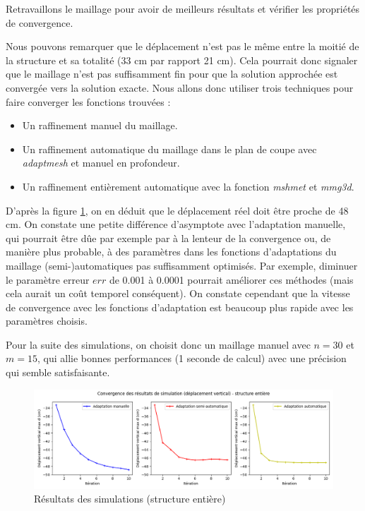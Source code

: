 \begin{problem}{4}
    Retravaillons le maillage pour avoir de meilleurs résultats et vérifier les propriétés de convergence.
\end{problem}

\begin{solution}

    Nous pouvons remarquer que le déplacement n'est pas le même entre la moitié de la structure et sa totalité (33 cm par rapport 21 cm).
    Cela pourrait donc signaler que le maillage n'est pas suffisamment fin pour que la solution approchée est convergée vers la solution exacte.
    Nous allons donc utiliser trois techniques pour faire converger les fonctions trouvées :
    \begin{itemize}
        \item Un raffinement manuel du maillage.
        \item Un raffinement automatique du maillage dans le plan de coupe avec \emph{adaptmesh} et manuel en profondeur.
        \item Un raffinement entièrement automatique avec la fonction \emph{mshmet} et \emph{mmg3d}.
    \end{itemize}

    D'après la figure \ref{fig:cvg}, on en déduit que le déplacement réel doit être proche de 48 cm. On constate une petite différence d'asymptote avec l'adaptation manuelle,
    qui pourrait être dûe par exemple par à la lenteur de la convergence ou, de manière plus probable, à des paramètres dans les fonctions d'adaptations du maillage
    (semi-)automatiques pas suffisamment optimisés. Par exemple, diminuer le paramètre erreur $err$ de 0.001 à 0.0001 pourrait améliorer ces méthodes (mais cela aurait un
    coût temporel conséquent). On constate cependant que la vitesse de convergence avec les fonctions d'adaptation est beaucoup plus rapide avec les paramètres choisis.

    Pour la suite des simulations, on choisit donc un maillage manuel avec $n=30$ et $m=15$, qui allie bonnes performances (1 seconde de calcul) avec une précision qui semble satisfaisante.
    
    \begin{figure}        
        \begin{center}
        
            \includegraphics[width=16.5cm]{imgs/cvg.png}
            \caption{Résultats des simulations (structure entière)}
            \label{fig:cvg}
        

\end{center}
\end{figure}
\end{solution}

